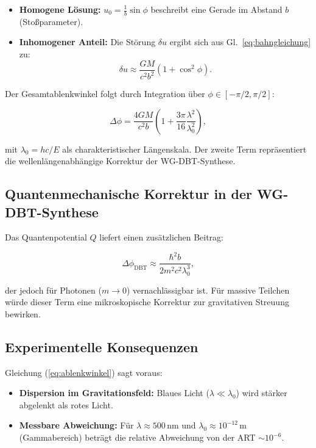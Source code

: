 \begin{itemize}
\item \textbf{Homogene Lösung:} $u_0 = \frac{1}{b} \sin \phi$ beschreibt eine Gerade im Abstand $b$ (Stoßparameter).
\item \textbf{Inhomogener Anteil:} Die Störung $\delta u$ ergibt sich aus Gl.~\ref{eq:bahngleichung} zu:
\begin{equation}
\delta u \approx \frac{GM}{c^2 b^2} (1 + \cos^2 \phi).
\end{equation}
\end{itemize}

Der Gesamtablenkwinkel folgt durch Integration über $\phi \in [-\pi/2, \pi/2]$:

\begin{equation}
    \label{eq:ablenkwinkel}
    \boxed
    {
        \Delta \phi = \frac{4GM}{c^2 b} \left(1 + \frac{3\pi}{16} \frac{\lambda^2}{\lambda_0^2}\right),
    }
\end{equation}

mit $\lambda_0 = hc/E$ als charakteristischer Längenskala. Der zweite Term repräsentiert die wellenlängenabhängige Korrektur der WG-DBT-Synthese.

\subsection{Quantenmechanische Korrektur in der WG-DBT-Synthese}
Das Quantenpotential $Q$ liefert einen zusätzlichen Beitrag:

\begin{equation}
\Delta \phi_{\text{DBT}} \approx \frac{\hbar^2 b}{2m^2 c^2 \lambda_0^3},
\end{equation}

der jedoch für Photonen ($m \to 0$) vernachlässigbar ist. Für massive Teilchen würde dieser Term eine mikroskopische Korrektur zur gravitativen Streuung bewirken.

\subsection{Experimentelle Konsequenzen}
Gleichung (\ref{eq:ablenkwinkel}) sagt voraus:
\begin{itemize}
\item \textbf{Dispersion im Gravitationsfeld:} Blaues Licht ($\lambda \ll \lambda_0$) wird stärker abgelenkt als rotes Licht.
\item \textbf{Messbare Abweichung:} Für $\lambda \approx 500\,\text{nm}$ und $\lambda_0 \approx 10^{-12}\,\text{m}$ (Gammabereich) beträgt die relative Abweichung von der ART $\sim 10^{-6}$.
\end{itemize}

